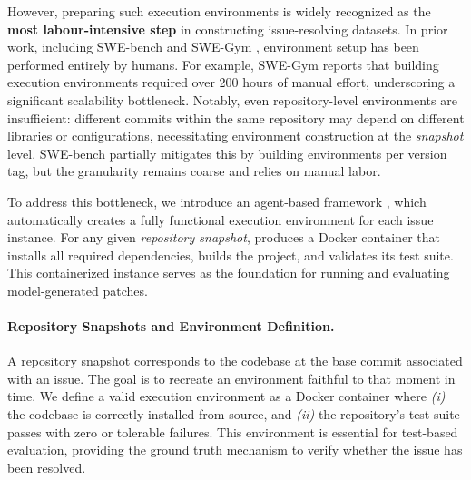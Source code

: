 However, preparing such execution environments is widely recognized as the \textbf{most labour-intensive step} in constructing issue-resolving datasets. In prior work, including SWE-bench \cite{swebench} and SWE-Gym \cite{swegym}, environment setup has been performed entirely by humans. For example, SWE-Gym reports that building execution environments required over 200 hours of manual effort, underscoring a significant scalability bottleneck. Notably, even repository-level environments are insufficient: different commits within the same repository may depend on different libraries or configurations, necessitating environment construction at the \textit{snapshot} level. SWE-bench partially mitigates this by building environments per version tag, but the granularity remains coarse and relies on manual labor.

To address this bottleneck, we introduce an agent-based framework \method, which automatically creates a fully functional execution environment for each issue instance. For any given \textit{repository snapshot}, \method produces a Docker container that installs all required dependencies, builds the project, and validates its test suite. This containerized instance serves as the foundation for running and evaluating model-generated patches.

\paragraph{Repository Snapshots and Environment Definition.}  
A repository snapshot corresponds to the codebase at the base commit associated with an issue. The goal is to recreate an environment faithful to that moment in time. We define a valid execution environment as a Docker container where \textit{(i)} the codebase is correctly installed from source, and \textit{(ii)} the repository's test suite passes with zero or tolerable failures. This environment is essential for test-based evaluation, providing the ground truth mechanism to verify whether the issue has been resolved.


